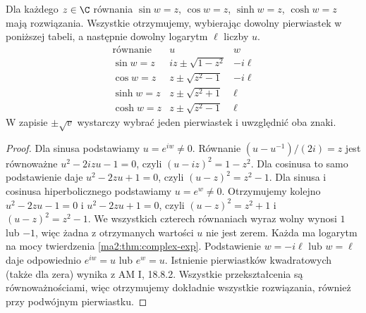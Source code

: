 \begin{twierdzenie}
\label{ma2:thm:complex-inverse-solutions}
Dla każdego $z\in\C$ równania $\sin w=z$, $\cos w=z$,
$\sinh w=z$, $\cosh w=z$ mają rozwiązania. Wszystkie
otrzymujemy, wybierając dowolny pierwiastek w poniższej
tabeli, a następnie dowolny logarytm $\ell$ liczby $u$.
\[
\begin{array}{c|c|c}
 \text{równanie}&u&w\\ \hline
 \sin w=z& iz\pm\sqrt{1-z^2}&-i\ell\\
 \cos w=z& z\pm\sqrt{z^2-1}&-i\ell\\
 \sinh w=z& z\pm\sqrt{z^2+1}&\ell\\
 \cosh w=z& z\pm\sqrt{z^2-1}&\ell
\end{array}
\]
W zapisie $\pm\sqrt{v}$ wystarczy wybrać jeden pierwiastek
i uwzględnić oba znaki.
\end{twierdzenie}
\begin{proof}
Dla sinusa podstawiamy $u=e^{iw}\ne0$. Równanie
$(u-u^{-1})/(2i)=z$ jest równoważne
$u^2-2izu-1=0$, czyli $(u-iz)^2=1-z^2$.
Dla cosinusa to samo podstawienie daje
$u^2-2zu+1=0$, czyli $(u-z)^2=z^2-1$.
Dla sinusa i cosinusa hiperbolicznego podstawiamy
$u=e^w\ne0$. Otrzymujemy kolejno
$u^2-2zu-1=0$ i $u^2-2zu+1=0$, czyli
$(u-z)^2=z^2+1$ i $(u-z)^2=z^2-1$.
We wszystkich czterech równaniach wyraz wolny wynosi
$1$ lub $-1$, więc żadna z otrzymanych wartości $u$
nie jest zerem. Każda ma logarytm na mocy twierdzenia
\ref{ma2:thm:complex-exp}. Podstawienie $w=-i\ell$
lub $w=\ell$ daje odpowiednio $e^{iw}=u$ lub $e^w=u$.
Istnienie pierwiastków kwadratowych (także dla zera)
wynika z AM I, 18.8.2. Wszystkie przekształcenia są równoważnościami, więc
otrzymujemy dokładnie wszystkie rozwiązania, również
przy podwójnym pierwiastku.
\end{proof}

